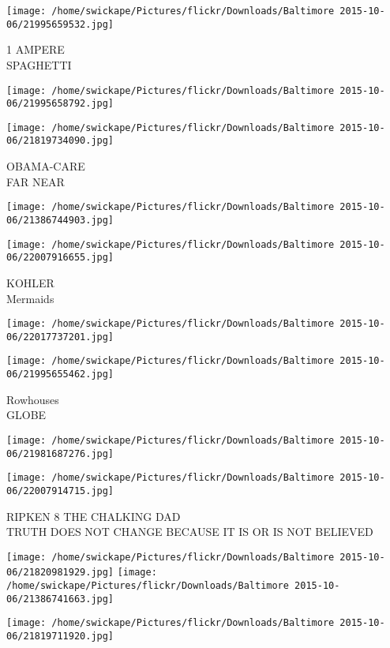 \documentclass[10pt,letterpaper]{article}
\begin{document}
\vspace{0.25in}
\texttt{[image: /home/swickape/Pictures/flickr/Downloads/Baltimore 2015-10-06/21995659532.jpg]}

1 AMPERE\\
SPAGHETTI
\pagebreak

\texttt{[image: /home/swickape/Pictures/flickr/Downloads/Baltimore 2015-10-06/21995658792.jpg]}

\vspace{0.25in}
\texttt{[image: /home/swickape/Pictures/flickr/Downloads/Baltimore 2015-10-06/21819734090.jpg]}

OBAMA{-}CARE\\
FAR NEAR
\pagebreak

\texttt{[image: /home/swickape/Pictures/flickr/Downloads/Baltimore 2015-10-06/21386744903.jpg]}

\vspace{0.25in}
\texttt{[image: /home/swickape/Pictures/flickr/Downloads/Baltimore 2015-10-06/22007916655.jpg]}

KOHLER\\
Mermaids
\pagebreak

\texttt{[image: /home/swickape/Pictures/flickr/Downloads/Baltimore 2015-10-06/22017737201.jpg]}

\vspace{0.25in}
\texttt{[image: /home/swickape/Pictures/flickr/Downloads/Baltimore 2015-10-06/21995655462.jpg]}

Rowhouses\\
GLOBE
\pagebreak

\texttt{[image: /home/swickape/Pictures/flickr/Downloads/Baltimore 2015-10-06/21981687276.jpg]}

\vspace{0.25in}
\texttt{[image: /home/swickape/Pictures/flickr/Downloads/Baltimore 2015-10-06/22007914715.jpg]}

RIPKEN 8 THE CHALKING DAD\\
TRUTH DOES NOT CHANGE BECAUSE IT IS OR IS NOT BELIEVED
\pagebreak

\texttt{[image: /home/swickape/Pictures/flickr/Downloads/Baltimore 2015-10-06/21820981929.jpg]}
\texttt{[image: /home/swickape/Pictures/flickr/Downloads/Baltimore 2015-10-06/21386741663.jpg]}

\vspace{0.25in}
\texttt{[image: /home/swickape/Pictures/flickr/Downloads/Baltimore 2015-10-06/21819711920.jpg]}
\end{document}
